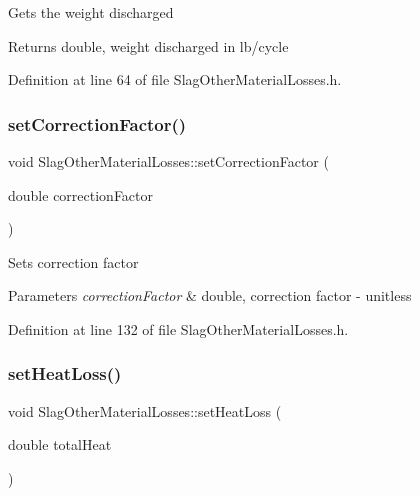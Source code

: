 Gets the weight discharged

\begin{DoxyReturn}{Returns}
double, weight discharged in lb/cycle 
\end{DoxyReturn}


Definition at line 64 of file Slag\+Other\+Material\+Losses.\+h.

\mbox{\label{class_slag_other_material_losses_a2aa985511888327bed6039da79c8958a}} 
\subsubsection{\texorpdfstring{set\+Correction\+Factor()}{setCorrectionFactor()}}
{\footnotesize\ttfamily void Slag\+Other\+Material\+Losses\+::set\+Correction\+Factor (\begin{DoxyParamCaption}\item[{double}]{correction\+Factor }\end{DoxyParamCaption})\hspace{0.3cm}{\ttfamily [inline]}}

Sets correction factor


\begin{DoxyParams}{Parameters}
{\em correction\+Factor} & double, correction factor -\/ unitless \\
\hline
\end{DoxyParams}


Definition at line 132 of file Slag\+Other\+Material\+Losses.\+h.

\mbox{\label{class_slag_other_material_losses_a33d59aed5492ec2912615e93b6ff273e}} 
\subsubsection{\texorpdfstring{set\+Heat\+Loss()}{setHeatLoss()}}
{\footnotesize\ttfamily void Slag\+Other\+Material\+Losses\+::set\+Heat\+Loss (\begin{DoxyParamCaption}\item[{double}]{total\+Heat }\end{DoxyParamCaption})\hspace{0.3cm}{\ttfamily [inline]}}

